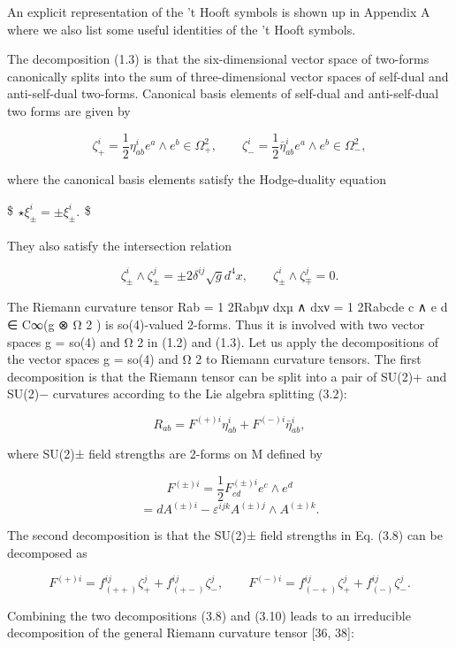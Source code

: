 \documentclass{article}
\begin{document}
An explicit representation of the 't Hooft symbols is shown up in Appendix A where we also list some useful identities of the 't Hooft symbols.

The decomposition (1.3) is that the six-dimensional vector space of two-forms canonically splits into the sum of three-dimensional vector spaces of self-dual and anti-self-dual two-forms. Canonical basis elements of self-dual and anti-self-dual two forms are given by

$$\zeta^{i}_{+}=\frac{1}{2}\eta^{i}_{ab}e^{a}\wedge e^{b}\in\Omega^{2}_{+},\qquad\zeta^{i}_{-}=\frac{1}{2}\bar{\eta}^{i}_{ab}e^{a}\wedge e^{b}\in\Omega^{2}_{-},\tag{3.5}$$

where the canonical basis elements satisfy the Hodge-duality equation

\$$\begin{array}{l}\mbox{$\star$}\xi^{i}_{\pm}=\pm\xi^{i}_{\pm}.\end{array}\tag{3.6}$\$

They also satisfy the intersection relation

$$\zeta^{i}_{\pm}\wedge\zeta^{j}_{\pm}=\pm2\delta^{ij}\sqrt{g}d^{4}x,\qquad\zeta^{i}_{\pm}\wedge\zeta^{j}_{\mp}=0.\tag{3.7}$$

The Riemann curvature tensor Rab = 1 2Rabµν dxµ ∧ dxν = 1 2Rabcde c ∧ e d ∈ C∞(g ⊗ Ω 2 ) is so(4)-valued 2-forms. Thus it is involved with two vector spaces g = so(4) and Ω 2 in (1.2) and (1.3). Let us apply the decompositions of the vector spaces g = so(4) and Ω 2 to Riemann curvature tensors. The first decomposition is that the Riemann tensor can be split into a pair of SU(2)+ and SU(2)− curvatures according to the Lie algebra splitting (3.2):

$$R_{ab}=F^{(+)i}\eta^{i}_{ab}+F^{(-)i}\bar{\eta}^{i}_{ab},\tag{3.8}$$

where SU(2)± field strengths are 2-forms on M defined by

$$F^{(\pm)i}=\frac{1}{2}F^{(\pm)i}_{cd}e^{c}\wedge e^{d}\tag{3.9}$$ $$=dA^{(\pm)i}-\varepsilon^{ijk}A^{(\pm)j}\wedge A^{(\pm)k}.$$

The second decomposition is that the SU(2)± field strengths in Eq. (3.8) can be decomposed as

$$F^{(+)i}=f^{ij}_{(++)}\zeta^{j}_{+}+f^{ij}_{(+-)}\zeta^{j}_{-},\qquad F^{(-)i}=f^{ij}_{(-+)}\zeta^{j}_{+}+f^{ij}_{(-)}\zeta^{j}_{-}.\tag{3.10}$$

Combining the two decompositions (3.8) and (3.10) leads to an irreducible decomposition of the general Riemann curvature tensor [36, 38]:
\end{document}

